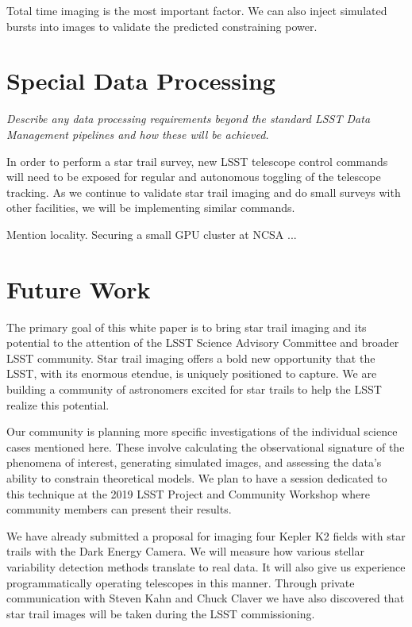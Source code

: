 \documentclass[12pt, letterpaper]{article}
\begin{document}
{\color{green}Total time imaging is the most important factor. We can also inject simulated bursts into images to validate the predicted constraining power. }

\vspace{.6in}

\section{Special Data Processing}
\begin{footnotesize}
{\it Describe any data processing requirements beyond the standard LSST Data Management pipelines and how these will be achieved.}
\end{footnotesize}

In order to perform a star trail survey, new LSST telescope control commands will need to be exposed for regular and autonomous toggling of the telescope tracking. As we continue to validate star trail imaging and do small surveys with other facilities, we will be implementing similar commands. 

{\color{green}Mention locality. Securing a small GPU cluster at NCSA ...}


\section{Future Work}
\label{sec:future}

The primary goal of this white paper is to bring star trail imaging and its potential to the attention of the LSST Science Advisory Committee and broader LSST community. Star trail imaging offers a bold new opportunity that the LSST, with its enormous etendue, is uniquely positioned to capture. We are building a community of astronomers excited for star trails to help the LSST  realize this potential.

Our community is planning more specific investigations of the individual science cases mentioned here. These involve calculating the observational signature of the phenomena of interest, generating simulated images, and assessing the data's ability to constrain theoretical models. We plan to have a session dedicated to this technique at the 2019 LSST Project and Community Workshop where community members can present their results.

We have already submitted a proposal for imaging four Kepler K2 fields with star trails with the Dark Energy Camera. We will measure how various stellar variability detection methods translate to real data. It will also give us experience programmatically operating telescopes in this manner. Through private communication with Steven Kahn and Chuck Claver we have also discovered that star trail images will be taken during the LSST commissioning. 



\end{document}
